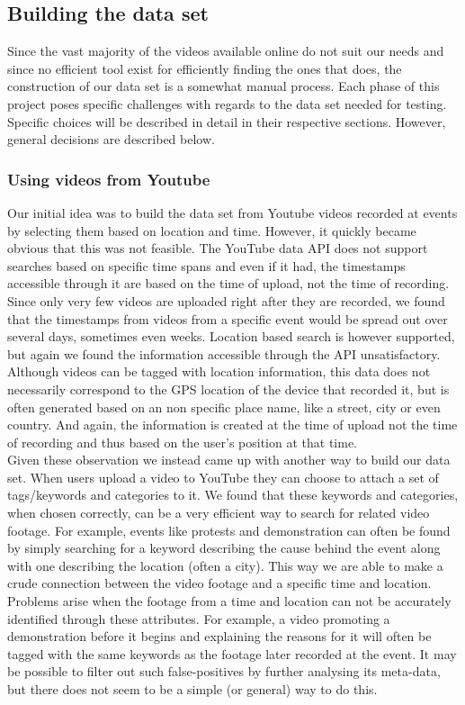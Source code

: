 \subsection{Building the data set}
%
Since the vast majority of the videos available online do not suit our needs and since no efficient tool exist for efficiently finding the ones that does, the construction of our data set is a somewhat manual process. Each phase of this project poses specific challenges with regards to the data set needed for testing. Specific choices will be described in detail in their respective sections. However, general decisions are described below.
%
\subsubsection{Using videos from Youtube}
%
Our initial idea was to build the data set from Youtube videos recorded at events by selecting them based on location and time. However, it quickly became obvious that this was not feasible. The YouTube data API does not support searches based on specific time spans and even if it had, the timestamps accessible through it are based on the time of upload, not the time of recording. Since only very few videos are uploaded right after they are recorded, we found that the timestamps from videos from a specific event would be spread out over several days, sometimes even weeks. Location based search is however supported, but again we found the information accessible through the API unsatisfactory. Although videos can be tagged with location information, this data does not necessarily correspond to the GPS location of the device that recorded it, but is often generated based on an non specific place name, like a street, city or even country. And again, the information is created at the time of upload not the time of recording and thus based on the user's position at that time.\\
Given these observation we instead came up with another way to build our data set. When users upload a video to YouTube they can choose to attach a set of tags/keywords and categories to it. We found that these keywords and categories, when chosen correctly, can be a very efficient way to search for related video footage. For example, events like protests and demonstration can often be found by simply searching for a keyword describing the cause behind the event along with one describing the location (often a city). This way we are able to make a crude connection between the video footage and a specific time and location. Problems arise when the footage from a time and location can not be accurately identified through these attributes. For example, a video promoting a demonstration before it begins and explaining the reasons for it will often be tagged with the same keywords as the footage later recorded at the event. It may be possible to filter out such false-positives by further analysing its meta-data, but there does not seem to be a simple (or general) way to do this.
%
